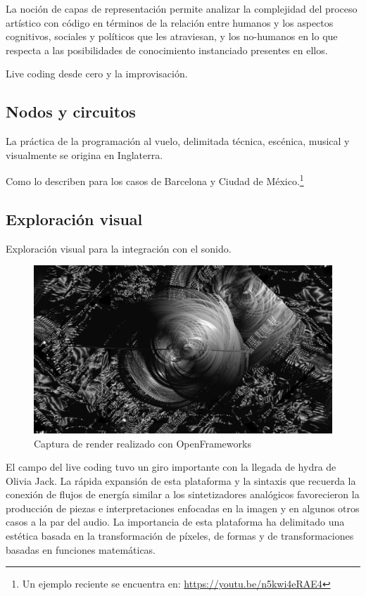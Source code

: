 La noción de capas de representación permite analizar la complejidad del proceso artístico con código en términos de la relación entre humanos y los aspectos cognitivos, sociales y políticos que les atraviesan, y los no-humanos en lo que respecta a las posibilidades de conocimiento instanciado presentes en ellos. 

Live coding desde cero y la improvisación. 

\subsection{Nodos y circuitos}

La práctica de la programación al vuelo, delimitada técnica, escénica, musical y visualmente se origina en Inglaterra. %

Como lo describen \cite{villasenor} para los casos de Barcelona y Ciudad de México.\footnote{Un ejemplo reciente se encuentra en: \url{https://youtu.be/n5kwi4eRAE4}} 

\subsection{Exploración visual}

Exploración visual para la integración con el sonido.  

\begin{figure}[tb]
\centering 
\includegraphics[width=\columnwidth]{../../img/of13.png} 
\caption[Openframeworks 1]{Captura de render realizado con OpenFrameworks} %
\label{fig:gallery} 
\end{figure}

El campo del live coding tuvo un giro importante con la llegada de hydra de Olivia Jack. La rápida expansión de esta plataforma y la sintaxis que recuerda la conexión de flujos de energía similar a los sintetizadores analógicos favorecieron la producción de piezas e interpretaciones enfocadas en la imagen y en algunos otros casos a la par del audio. La importancia de esta plataforma ha delimitado una estética  basada en  la transformación de píxeles, de formas y de transformaciones basadas en funciones matemáticas.

